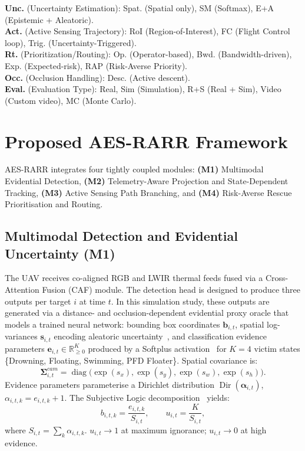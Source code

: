\documentclass[11pt,a4paper]{article}
\begin{document}
\begin{table}[t!]
\textbf{Unc.} (Uncertainty Estimation): Spat. (Spatial only), SM (Softmax), E+A (Epistemic + Aleatoric). \\
\textbf{Act.} (Active Sensing Trajectory): RoI (Region-of-Interest), FC (Flight Control loop), Trig. (Uncertainty-Triggered). \\
\textbf{Rt.} (Prioritization/Routing): Op. (Operator-based), Bwd. (Bandwidth-driven), Exp. (Expected-risk), RAP (Risk-Averse Priority). \\
\textbf{Occ.} (Occlusion Handling): Desc. (Active descent). \\
\textbf{Eval.} (Evaluation Type): Real, Sim (Simulation), R+S (Real + Sim), Video (Custom video), MC (Monte Carlo).
\end{table}

\section{Proposed AES-RARR Framework}

AES-RARR integrates four tightly coupled modules:
\textbf{(M1)} Multimodal Evidential Detection,
\textbf{(M2)} Telemetry-Aware Projection and State-Dependent Tracking,
\textbf{(M3)} Active Sensing Path Branching, and
\textbf{(M4)} Risk-Averse Rescue Prioritisation and Routing.

\subsection{Multimodal Detection and Evidential Uncertainty (M1)}

The UAV receives co-aligned RGB and LWIR thermal feeds fused via a
Cross-Attention Fusion (CAF) module.
The detection head is designed to produce three outputs per target $i$ at time $t$. In this simulation study, these outputs are generated via a distance- and occlusion-dependent evidential proxy oracle that models a trained neural network:
bounding box coordinates $\mathbf{b}_{i,t}$,
spatial log-variances $\mathbf{s}_{i,t}$ encoding aleatoric
uncertainty~\cite{kendall2017}, and classification evidence parameters
$\mathbf{e}_{i,t} \in \mathbb{R}^K_{\geq 0}$ produced by a
Softplus activation~\cite{sensoy2018}
for $K = 4$ victim states \{Drowning, Floating, Swimming, PFD Floater\}.
Spatial covariance is:
\begin{equation}
  \boldsymbol{\Sigma}^{cam}_{i,t}
  = \operatorname{diag}\!\bigl(\exp(s_x),\exp(s_y),\exp(s_w),\exp(s_h)\bigr).
\end{equation}
Evidence parameters parameterise a Dirichlet distribution
$\operatorname{Dir}(\boldsymbol{\alpha}_{i,t})$,
$\alpha_{i,t,k} = e_{i,t,k} + 1$.
The Subjective Logic decomposition~\cite{sensoy2018} yields:
\begin{equation}
  b_{i,t,k} = \frac{e_{i,t,k}}{S_{i,t}},
  \qquad
  u_{i,t} = \frac{K}{S_{i,t}},
  \label{eq:edl}
\end{equation}
where $S_{i,t} = \sum_k \alpha_{i,t,k}$.
$u_{i,t} \to 1$ at maximum ignorance; $u_{i,t} \to 0$ at high evidence.
\end{document}
